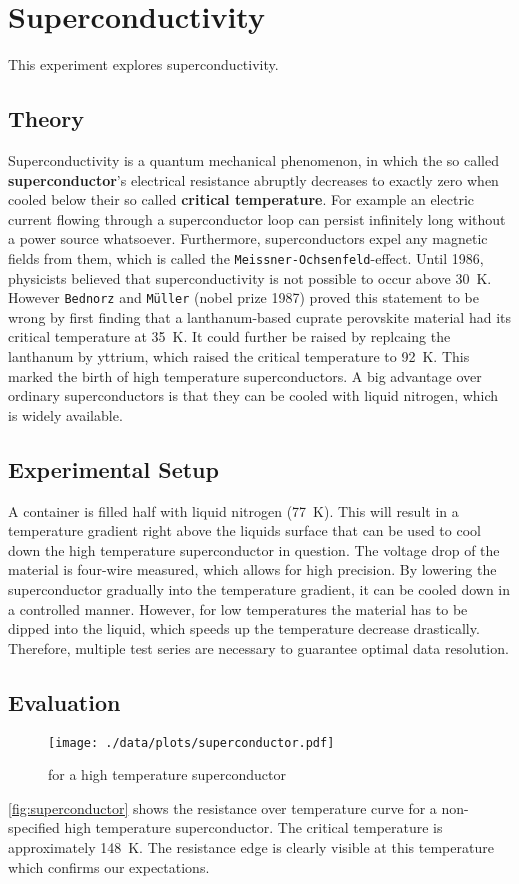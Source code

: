 \chapter{Superconductivity}
This experiment explores superconductivity.

\section{Theory}
Superconductivity is a quantum mechanical phenomenon, in which the so called \textbf{superconductor}'s electrical resistance abruptly decreases to exactly zero when cooled below their so called \textbf{critical temperature}.
For example an electric current flowing through a superconductor loop can persist infinitely long without a power source whatsoever.
Furthermore, superconductors expel any magnetic fields from them, which is called the \texttt{Meissner-Ochsenfeld}-effect.
Until 1986, physicists believed that superconductivity is not possible to occur above \SI{30}{\kelvin}.
However \texttt{Bednorz} and \texttt{Müller} (nobel prize 1987) proved this statement to be wrong by first finding that a lanthanum-based cuprate perovskite material had its critical temperature at \SI{35}{\kelvin}.
It could further be raised by replcaing the lanthanum by yttrium, which raised the critical temperature to \SI{92}{\kelvin}\cite{PhysRevLett.58.908}.
This marked the birth of high temperature superconductors.
A big advantage over ordinary superconductors is that they can be cooled with liquid nitrogen, which is widely available.

\section{Experimental Setup}
A container is filled half with liquid nitrogen (\SI{77}{\kelvin}).
This will result in a temperature gradient right above the liquids surface that can be used to cool down the high temperature superconductor in question.
The voltage drop of the material is four-wire measured, which allows for high precision.
By lowering the superconductor gradually into the temperature gradient, it can be cooled down in a controlled manner.
However, for low temperatures the material has to be dipped into the liquid, which speeds up the temperature decrease drastically.
Therefore, multiple test series are necessary to guarantee optimal data resolution.

\section{Evaluation}
\begin{figure}[tbp]
	\centering
	\texttt{[image: ./data/plots/superconductor.pdf]}
	\caption[Superconductivity: Resistance over temperature]{ for a high temperature superconductor}
	\label{fig:superconductor}
\end{figure}
\autoref{fig:superconductor} shows the resistance over temperature curve for a non-specified high temperature superconductor.
The critical temperature is approximately \SI{148}{\kelvin}.
The resistance edge is clearly visible at this temperature which confirms our expectations.
